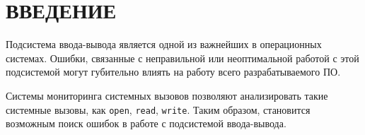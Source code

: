 \chapter*{ВВЕДЕНИЕ}

Подсистема ввода-вывода является одной из важнейших в операционных системах. Ошибки, связанные с неправильной или неоптимальной работой с этой подсистемой могут губительно влиять на работу всего разрабатываемого ПО.

Системы мониторинга системных вызовов позволяют анализировать такие системные вызовы, как \texttt{open}, \texttt{read}, \texttt{write}. Таким образом, становится возможным поиск ошибок в работе с подсистемой ввода-вывода.


